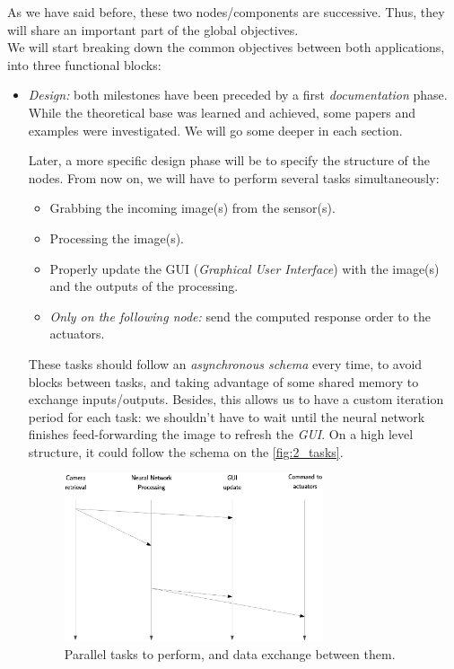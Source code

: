 As we have said before, these two nodes/components are successive. Thus, they will share an important part of the global objectives.\\

We will start breaking down the common objectives between both applications, into three functional blocks:

\begin{itemize}
	\item \textit{Design:} both milestones have been preceded by a first \textit{documentation} phase. While the theoretical base was learned and achieved, some papers and examples were investigated. We will go some deeper in each section.
	
	Later, a more specific design phase will be to specify the structure of the nodes.
	From now on, we will have to perform several tasks simultaneously:
	\begin{itemize}
		\item Grabbing the incoming image(s) from the sensor(s).
		\item Processing the image(s).
		\item Properly update the GUI (\textit{Graphical User Interface}) with the image(s) and the outputs of the processing.
		\item \textit{Only on the following node:} send the computed response order to the actuators.
	\end{itemize}
	These tasks should follow an \emph{asynchronous schema} every time, to avoid blocks between tasks, and taking advantage of some shared memory to exchange inputs/outputs. Besides, this allows us to have a custom iteration period for each task: we shouldn't have to wait until the neural network finishes feed-forwarding the image to refresh the \emph{GUI}. On a high level structure, it could follow the schema on the \autoref{fig:2_tasks}.
	
	\begin{figure}[h]
		\centering
		\includegraphics[width=3in]{images/tasks_threads}
		\caption{Parallel tasks to perform, and data exchange between them.}
		\label{fig:2_tasks}
	\end{figure}
	

\end{itemize}
